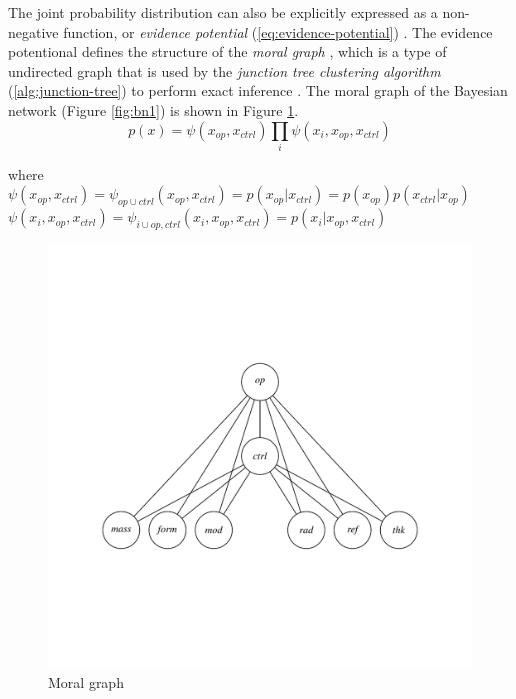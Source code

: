 \noindent The joint probability distribution can also be explicitly expressed as a non-negative function, or \textit{evidence potential} (\ref{eq:evidence-potential}) \cite{lauritzen1988}.
The evidence potentional defines the structure of the \textit{moral graph} \cite{darwiche}, which is a type of undirected graph that is used by the \textit{junction tree clustering algorithm} (\ref{alg:junction-tree}) to perform exact inference \cite{scutari}.
The moral graph of the Bayesian network (Figure \ref{fig:bn1}) is shown in Figure \ref{fig:moral-graph}.
%
\begin{equation}
  \label{eq:evidence-potential}
  p(x) = \psi(x_{op}, x_{ctrl}) \prod_{i} \psi(x_{i}, x_{op}, x_{ctrl})
\end{equation}

\noindent where \\
\indent $\psi(x_{op}, x_{ctrl}) = \psi_{op \cup ctrl}(x_{op}, x_{ctrl}) = p(x_{op} | x_{ctrl}) = p(x_{op}) p(x_{ctrl} | x_{op})$ \\
\indent $\psi(x_{i}, x_{op}, x_{ctrl}) = \psi_{i \cup op, ctrl}(x_{i}, x_{op}, x_{ctrl}) = p(x_{i} | x_{op}, x_{ctrl})$ \\

\begin{figure}[H]
  \centering
  \includegraphics[trim={1cm 4.8cm 1cm 4.8cm}, width=\textwidth]{figures/moral-graph.pdf}
  \caption{Moral graph}
  \label{fig:moral-graph}
\end{figure}

